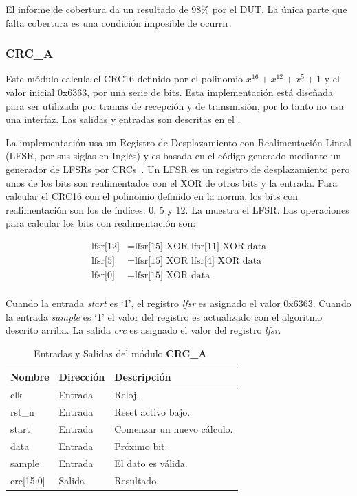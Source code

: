 \documentclass[a4paper, twoside, 11pt]{report}
\begin{document}
El informe de cobertura da un resultado de 98\% por el DUT. La única parte que falta cobertura es una condición imposible de ocurrir.

\FloatBarrier
\subsubsection{CRC\_A}

Este módulo calcula el CRC16 definido por el polinomio $x^{16} + x^{12} + x^{5} + 1$ y el valor inicial 0x6363, por una serie de bits. Esta implementación está diseñada para ser utilizada por tramas de recepción y de transmisión, por lo tanto no usa una interfaz. Las salidas y entradas son descritas en el .

La implementación usa un Registro de Desplazamiento con Realimentación Lineal (LFSR, por sus siglas en Inglés) y es basada en el código generado mediante un generador de LFSRs por CRCs~\cite{crcgen}. Un LFSR es un registro de desplazamiento pero unos de los bits son realimentados con el XOR de otros bits y la entrada. Para calcular el CRC16 con el polinomio definido en la norma, los bits con realimentación son los de índices: 0, 5 y 12. La  muestra el LFSR. Las operaciones para calcular los bits con realimentación son:

{%
  \setlength{\abovedisplayskip}{-3pt}
  \setlength{\belowdisplayskip}{\abovedisplayskip}
  \setlength{\abovedisplayshortskip}{0pt}
  \setlength{\belowdisplayshortskip}{0pt}
  \begin{align*}
    \text{lfsr[12]} &= \text{lfsr[15] XOR lfsr[11] XOR data} \\
    \text{lfsr[5]}  &= \text{lfsr[15] XOR lfsr[4] XOR data} \\
    \text{lfsr[0]}  &= \text{lfsr[15] XOR data}  \\
  \end{align*}
}%

Cuando la entrada \textit{start} es ‘1’, el registro \textit{lfsr} es asignado el valor 0x6363. Cuando la entrada \textit{sample} es ‘1’ el valor del registro es actualizado con el algoritmo descrito arriba. La salida \textit{crc} es asignado el valor del registro \textit{lfsr}.

\begin{table}[htb]
  \centering
  \tablezebra
  \begin{tabulary}{\linewidth}{l|l|L}
    \textbf{Nombre}&\textbf{Dirección}&\textbf{Descripción} \\
    \hline
    clk&Entrada&Reloj. \\
    rst\_n&Entrada&Reset activo bajo. \\
    start&Entrada&Comenzar un nuevo cálculo. \\
    data&Entrada&Próximo bit. \\
    sample&Entrada&El dato es válida. \\
    crc[15:0]&Salida&Resultado. \\
  \end{tabulary}
  \caption{Entradas y Salidas del módulo \textbf{CRC\_A}.}
  \label{tab:ports_crc_a}
\end{table}
\end{document}
